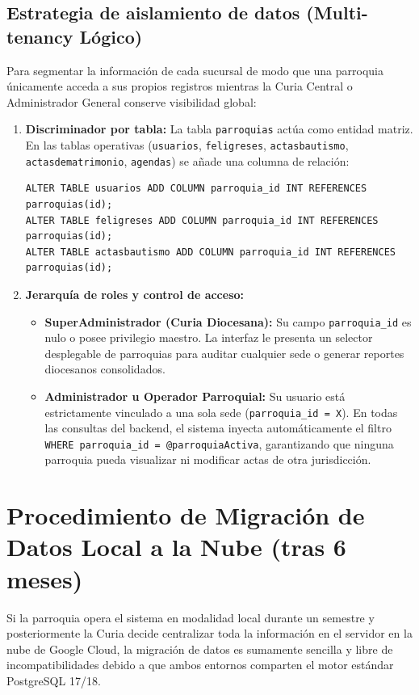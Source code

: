 \subsection{Estrategia de aislamiento de datos (Multi-tenancy Lógico)}
Para segmentar la información de cada sucursal de modo que una parroquia únicamente acceda a sus propios registros mientras la Curia Central o Administrador General conserve visibilidad global:
\begin{enumerate}
    \item \textbf{Discriminador por tabla:} La tabla \texttt{parroquias} actúa como entidad matriz. En las tablas operativas (\texttt{usuarios}, \texttt{feligreses}, \texttt{actasbautismo}, \texttt{actasdematrimonio}, \texttt{agendas}) se añade una columna de relación:
    \begin{lstlisting}[style=sql]
ALTER TABLE usuarios ADD COLUMN parroquia_id INT REFERENCES parroquias(id);
ALTER TABLE feligreses ADD COLUMN parroquia_id INT REFERENCES parroquias(id);
ALTER TABLE actasbautismo ADD COLUMN parroquia_id INT REFERENCES parroquias(id);
\end{lstlisting}
    \item \textbf{Jerarquía de roles y control de acceso:}
    \begin{itemize}
        \item \textbf{SuperAdministrador (Curia Diocesana):} Su campo \texttt{parroquia\_id} es nulo o posee privilegio maestro. La interfaz le presenta un selector desplegable de parroquias para auditar cualquier sede o generar reportes diocesanos consolidados.
        \item \textbf{Administrador u Operador Parroquial:} Su usuario está estrictamente vinculado a una sola sede (\texttt{parroquia\_id = X}). En todas las consultas del backend, el sistema inyecta automáticamente el filtro \texttt{WHERE parroquia\_id = @parroquiaActiva}, garantizando que ninguna parroquia pueda visualizar ni modificar actas de otra jurisdicción.
    \end{itemize}
\end{enumerate}

\section{Procedimiento de Migración de Datos Local a la Nube (tras 6 meses)}\label{sec:migracion-cloud}
Si la parroquia opera el sistema en modalidad local durante un semestre y posteriormente la Curia decide centralizar toda la información en el servidor en la nube de Google Cloud, la migración de datos es sumamente sencilla y libre de incompatibilidades debido a que ambos entornos comparten el motor estándar PostgreSQL 17/18.

